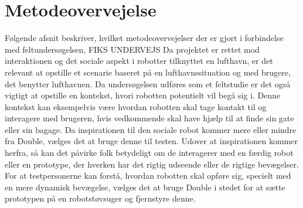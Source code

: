 \section{Metodeovervejelse}
\label{ParametreMetodeovervejelser}
%
Følgende afsnit beskriver, hvilket metodeovervejelser der er gjort i forbindelse med feltundersøgelsen, FIKS UNDERVEJS\blankline
%
Da projektet er rettet mod interaktionen og det sociale aspekt i robotter tilknyttet en lufthavn, er det relevant at opstille et scenarie baseret på en lufthavnssituation og med brugere, det benytter lufthavnen. Da undersøgelsen udføres som et feltstudie er det også vigtigt at opstille en kontekst, hvori robotten potentielt vil begå sig i. Denne kontekst kan eksempelvis være hvordan robotten skal tage kontakt til og interagere med brugeren, hvis vedkommende skal have hjælp til at finde sin gate eller sin bagage.\blankline
%
Da inspirationen til den sociale robot kommer mere eller mindre fra Double, vælges det at bruge denne til testen. Udover at inspirationen kommer herfra, så kan det påvirke folk betydeligt om de interagerer med en færdig robot eller en prototype, der hverken har det rigtig udseende eller de rigtige bevægelser. For at testpersonerne kan forstå, hvordan robotten skal opføre sig, specielt med en mere dynamisk bevægelse, vælges det at bruge Double i stedet for at sætte prototypen på en robotstøvsuger og fjernstyre denne. 